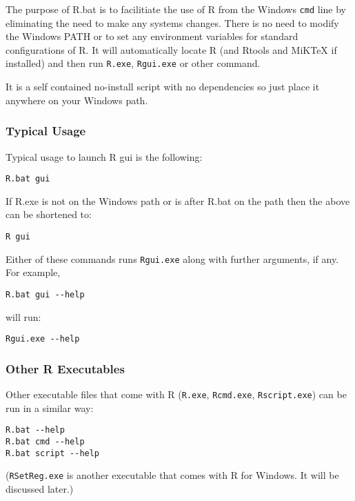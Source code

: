 The purpose of R.bat is to facilitiate the use of R from the Windows
\texttt{cmd} line by eliminating the need to make any systems changes.
There is no need to modify the Windows PATH or to set any environment
variables for standard configurations of R. It will automatically locate
R (and Rtools and MiKTeX if installed) and then run \texttt{R.exe},
\texttt{Rgui.exe} or other command.

It is a self contained no-install script with no dependencies so just
place it anywhere on your Windows path.

\subsubsection{Typical Usage}

Typical usage to launch R gui is the following:

\begin{verbatim}
R.bat gui
\end{verbatim}

If R.exe is not on the Windows path or is after R.bat on the path then
the above can be shortened to:

\begin{verbatim}
R gui
\end{verbatim}

Either of these commands runs \texttt{Rgui.exe} along with further
arguments, if any. For example,

\begin{verbatim}
R.bat gui --help
\end{verbatim}

will run:

\begin{verbatim}
Rgui.exe --help
\end{verbatim}

\subsubsection{Other R Executables}

Other executable files that come with R (\texttt{R.exe},
\texttt{Rcmd.exe}, \texttt{Rscript.exe}) can be run in a similar way:

\begin{verbatim}
R.bat --help
R.bat cmd --help
R.bat script --help
\end{verbatim}

(\texttt{RSetReg.exe} is another executable that comes with R for
Windows. It will be discussed later.)


